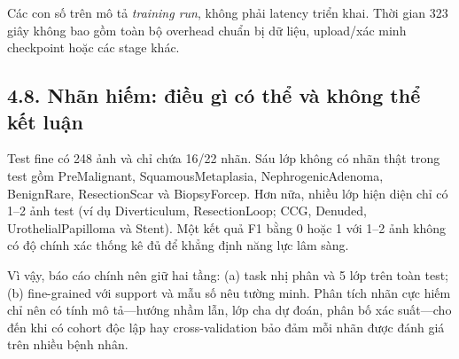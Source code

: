 \documentclass[
  10pt,
  a4paper,
  twocolumn]{article}
\begin{document}
\begin{table}[htbp]
\centering
\caption{Thông số chi phí và tài nguyên huấn luyện mô hình đề xuất.}
\label{tab:table17}
\vspace{2pt}
\end{table}

Các con số trên mô tả \emph{training run}, không phải latency triển
khai. Thời gian 323 giây không bao gồm toàn bộ overhead chuẩn bị dữ
liệu, upload/xác minh checkpoint hoặc các stage khác.

\subsection{4.8. Nhãn hiếm: điều gì có thể và không thể kết
luận}\label{nhuxe3n-hiux1ebfm-ux111iux1ec1u-guxec-cuxf3-thux1ec3-vuxe0-khuxf4ng-thux1ec3-kux1ebft-luux1eadn}

Test fine có 248 ảnh và chỉ chứa 16/22 nhãn. Sáu lớp không có nhãn thật
trong test gồm PreMalignant, SquamousMetaplasia, NephrogenicAdenoma,
BenignRare, ResectionScar và BiopsyForcep. Hơn nữa, nhiều lớp hiện diện
chỉ có 1--2 ảnh test (ví dụ Diverticulum, ResectionLoop; CCG, Denuded,
UrothelialPapilloma và Stent). Một kết quả F1 bằng 0 hoặc 1 với 1--2 ảnh
không có độ chính xác thống kê đủ để khẳng định năng lực lâm sàng.

Vì vậy, báo cáo chính nên giữ hai tầng: (a) task nhị phân và 5 lớp trên
toàn test; (b) fine-grained với support và mẫu số nêu tường minh. Phân
tích nhãn cực hiếm chỉ nên có tính mô tả---hướng nhầm lẫn, lớp cha dự
đoán, phân bố xác suất---cho đến khi có cohort độc lập hay
cross-validation bảo đảm mỗi nhãn được đánh giá trên nhiều bệnh nhân.
\end{document}
